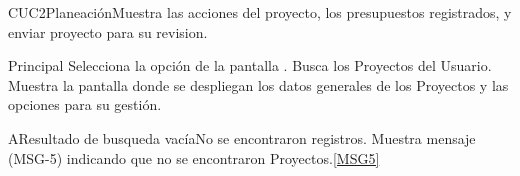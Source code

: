 
  \begin{UseCase}{CUC2}{Planeación}{Muestra las acciones del proyecto, los presupuestos registrados, y enviar proyecto para su revision.}
  \end{UseCase}
  \begin{UCtrayectoria}{Principal}
    \UCpaso[\UCactor] Selecciona la opción  de la pantalla .
    \UCpaso Busca los Proyectos del Usuario.
    \UCpaso Muestra la pantalla  donde se despliegan los datos generales de los Proyectos y las opciones para su gestión.
  \end{UCtrayectoria}

  \begin{UCtrayectoriaA}{A}{Resultado de busqueda vacía}{No se encontraron registros.}
    \UCpaso Muestra mensaje (MSG-5) indicando que no se encontraron Proyectos.\ref{MSG5}
  \end{UCtrayectoriaA}

